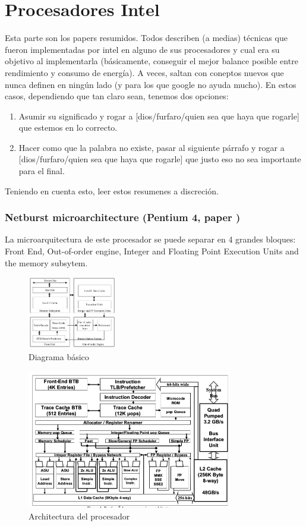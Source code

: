 \part{Procesadores Intel}
Esta parte son los papers resumidos. Todos describen (a medias) técnicas que fueron implementadas por intel en alguno de sus procesadores y cual era su objetivo al implementarla (básicamente, conseguir el mejor balance posible entre rendimiento y consumo de energía). A veces, saltan con coneptos nuevos que nunca definen en ningún lado (y para los que google no ayuda mucho). En estos casos, dependiendo que tan claro sean, tenemos dos opciones:
\begin{enumerate}
	\item Asumir su significado y rogar a [dios/furfaro/quien sea que haya que rogarle] que estemos en lo correcto.
	\item Hacer como que la palabra no existe, pasar al siguiente párrafo y rogar a [dios/furfaro/quien sea que haya que rogarle] que justo eso no sea importante para el final.
\end{enumerate}

Teniendo en cuenta esto, leer estos resumenes a discreción.

\section{Netburst microarchitecture (Pentium 4, paper \cite{Sager01themicroarchitecture})}
La microarquitectura de este procesador se puede separar en 4 grandes bloques: Front End, Out-of-order engine, Integer and Floating Point Execution Units and the memory subsytem.

\begin{figure}[ht]
	\centering
	\includegraphics[width=0.35\textwidth]{imagenes/p4-block-architecture}
	\caption{Diagrama básico}
	\label{fig:p4DiagramaBasico}
\end{figure}
\begin{figure}[ht]
	\centering
	\includegraphics[width=0.8\textwidth]{imagenes/p4-architecture}
	\caption{Architectura del procesador}
	\label{fig:p4DiagramaCompleto}
\end{figure}

